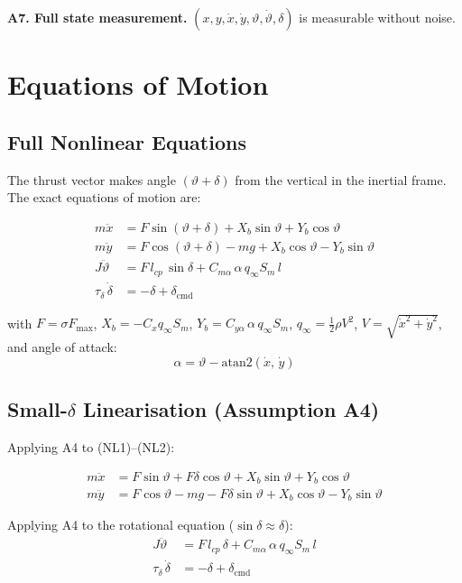 \documentclass[11pt,a4paper]{article}
\theoremstyle{plain}
\theoremstyle{remark}
\newcommand{\vth}{\vartheta}
\newcommand{\dcmd}{\delta_{\mathrm{cmd}}}
\newcommand{\Fmax}{F_{\max}}
\begin{document}
\textbf{A7. Full state measurement.} $(x, y, \dot x, \dot y, \vth, \dot\vth, \delta)$ is measurable without noise.

\section{Equations of Motion}

\subsection{Full Nonlinear Equations}

The thrust vector makes angle $(\vth + \delta)$ from the vertical in the inertial frame. The exact equations of motion are:

\begin{align}
  m\ddot x &= F\sin(\vth + \delta) + X_b\sin\vth + Y_b\cos\vth \tag{NL1} \\
  m\ddot y &= F\cos(\vth + \delta) - mg + X_b\cos\vth - Y_b\sin\vth \tag{NL2} \\
  J\ddot\vth &= F\,l_{cp}\,\sin\delta + C_{m\alpha}\,\alpha\,q_\infty S_m\,l \tag{NL3} \\
  \tau_\delta\,\dot\delta &= -\delta + \dcmd \tag{NL4}
\end{align}

with $F = \sigma \Fmax$, $X_b = -C_x q_\infty S_m$, $Y_b = C_{y\alpha}\,\alpha\,q_\infty S_m$, $q_\infty = \tfrac{1}{2}\rho V^2$, $V = \sqrt{\dot x^2 + \dot y^2}$, and angle of attack:
\[
  \alpha = \vth - \mathrm{atan2}(\dot x,\, \dot y)
\]

\subsection{Small-\texorpdfstring{$\delta$}{delta} Linearisation (Assumption A4)}

Applying A4 to (NL1)--(NL2):

\begin{align}
  m\ddot x &= F\sin\vth + F\delta\cos\vth + X_b\sin\vth + Y_b\cos\vth \tag{T1} \\
  m\ddot y &= F\cos\vth - mg - F\delta\sin\vth + X_b\cos\vth - Y_b\sin\vth \tag{T2}
\end{align}

Applying A4 to the rotational equation ($\sin\delta \approx \delta$):
\begin{align}
  J\ddot\vth &= F\,l_{cp}\,\delta + C_{m\alpha}\,\alpha\,q_\infty S_m\,l \tag{R1} \\
  \tau_\delta\,\dot\delta &= -\delta + \dcmd \tag{A1}
\end{align}
\end{document}

